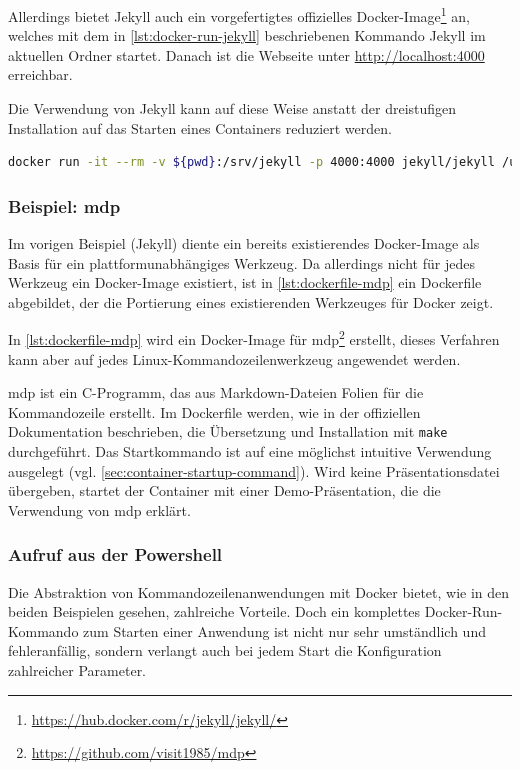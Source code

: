 Allerdings bietet Jekyll auch ein vorgefertigtes offizielles Docker-Image\footnote{\url{https://hub.docker.com/r/jekyll/jekyll/}} an, welches mit dem in \cref{lst:docker-run-jekyll} beschriebenen Kommando Jekyll im aktuellen Ordner startet.
Danach ist die Webseite unter \url{http://localhost:4000} erreichbar.

Die Verwendung von Jekyll kann auf diese Weise anstatt der dreistufigen Installation auf das Starten eines Containers reduziert werden.

\begin{lstlisting}[caption=Docker-Kommando zum Starten von Jekyll, language=bash, label=lst:docker-run-jekyll]
docker run -it --rm -v ${pwd}:/srv/jekyll -p 4000:4000 jekyll/jekyll /usr/local/bin/jekyll serve
\end{lstlisting}

\subsubsection{Beispiel: mdp}
Im vorigen Beispiel (Jekyll) diente ein bereits existierendes Docker-Image als Basis für ein plattformunabhängiges Werkzeug.
Da allerdings nicht für jedes Werkzeug ein Docker-Image existiert, ist in \cref{lst:dockerfile-mdp} ein Dockerfile abgebildet, der die Portierung eines existierenden Werkzeuges für Docker zeigt.


In \cref{lst:dockerfile-mdp} wird ein Docker-Image für mdp\footnote{\url{https://github.com/visit1985/mdp}} erstellt, dieses Verfahren kann aber auf jedes Linux-Kommandozeilenwerkzeug angewendet werden.

mdp ist ein C-Programm, das aus Markdown-Dateien Folien für die Kommandozeile erstellt.
Im Dockerfile werden, wie in der offiziellen Dokumentation beschrieben, die Übersetzung und Installation mit \texttt{make} durchgeführt.
Das Startkommando ist auf eine möglichst intuitive Verwendung ausgelegt (vgl. \cref{sec:container-startup-command}).
Wird keine Präsentationsdatei übergeben, startet der Container mit einer Demo-Präsentation, die die Verwendung von mdp erklärt.


\subsubsection{Aufruf aus der Powershell}
Die Abstraktion von Kommandozeilenanwendungen mit Docker bietet, wie in den beiden Beispielen gesehen, zahlreiche Vorteile.
Doch ein komplettes Docker-Run-Kommando zum Starten einer Anwendung ist nicht nur sehr umständlich und fehleranfällig, sondern verlangt auch bei jedem Start die Konfiguration zahlreicher Parameter.

